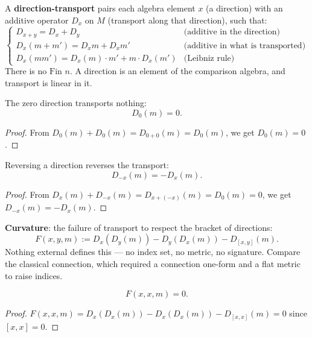 \begin{definition}
A \textbf{direction-transport} pairs each algebra element $x$ (a direction) with an additive operator $D_x$ on $M$ (transport along that direction), such that:
\[
\begin{cases}
D_{x+y} = D_x + D_y & \text{(additive in the direction)}\\
D_x(m + m') = D_x m + D_x m' & \text{(additive in what is transported)}\\
D_x(mm') = D_x(m) \cdot m' + m \cdot D_x(m') & \text{(Leibniz rule)}
\end{cases}
\]
There is no $\text{Fin } n$. A direction is an element of the comparison algebra, and transport is linear in it.
\end{definition}

\begin{theorem}
The zero direction transports nothing:
\[
D_0(m) = 0.
\]
\begin{proof}
From $D_0(m) + D_0(m) = D_{0+0}(m) = D_0(m)$, we get $D_0(m) = 0$.
\end{proof}
\end{theorem}

\begin{theorem}
Reversing a direction reverses the transport:
\[
D_{-x}(m) = -D_x(m).
\]
\begin{proof}
From $D_x(m) + D_{-x}(m) = D_{x + (-x)}(m) = D_0(m) = 0$, we get $D_{-x}(m) = -D_x(m)$.
\end{proof}
\end{theorem}

\begin{definition}
\textbf{Curvature}: the failure of transport to respect the bracket of directions:
\[
F(x, y, m) := D_x(D_y(m)) - D_y(D_x(m)) - D_{[x,y]}(m).
\]
Nothing external defines this — no index set, no metric, no signature. Compare the classical connection, which required a connection one-form and a flat metric to raise indices.
\end{definition}

\begin{theorem}
\[
F(x, x, m) = 0.
\]
\begin{proof}
$F(x, x, m) = D_x(D_x(m)) - D_x(D_x(m)) - D_{[x,x]}(m) = 0$ since $[x, x] = 0$.
\end{proof}
\end{theorem}

